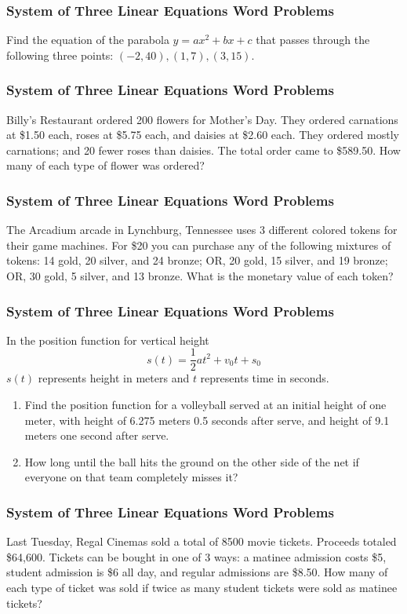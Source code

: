 \documentclass[xcolor=dvipsnames]{beamer}
\begin{document}
\begin{frame}
  \frametitle{System of Three Linear Equations Word Problems}
  {\ubung} Find the equation of the parabola $y=ax^{2}+bx+c$ that
  passes through the following three points: $(-2,40),(1,7),(3,15)$.
\end{frame}

\begin{frame}
  \frametitle{System of Three Linear Equations Word Problems}
  {\ubung} Billy's Restaurant ordered 200 flowers for Mother's Day.
  They ordered carnations at \$1.50 each, roses at \$5.75 each, and
  daisies at \$2.60 each. They ordered mostly carnations; and 20 fewer
  roses than daisies. The total order came to \$589.50. How many of
  each type of flower was ordered?
\end{frame}

\begin{frame}
  \frametitle{System of Three Linear Equations Word Problems}
  {\ubung} The Arcadium arcade in Lynchburg, Tennessee uses 3
  different colored tokens for their game machines. For \$20 you can
  purchase any of the following mixtures of tokens: 14 gold, 20
  silver, and 24 bronze; OR, 20 gold, 15 silver, and 19 bronze; OR, 30
  gold, 5 silver, and 13 bronze. What is the monetary value of each
  token?
\end{frame}

\begin{frame}
  \frametitle{System of Three Linear Equations Word Problems}
  {\ubung} In the position function for vertical height
  \begin{equation}
    \label{eq:eicheuth}
    s(t)=\frac{1}{2}at^{2}+v_{0}t+s_{0}
  \end{equation}
  $s(t)$ represents height in meters and $t$ represents time in
  seconds.
  \begin{enumerate}
  \item Find the position function for a volleyball served at an
    initial height of one meter, with height of 6.275 meters 0.5
    seconds after serve, and height of 9.1 meters one second after
    serve.
  \item How long until the ball hits the ground on the other side of
    the net if everyone on that team completely misses it?
  \end{enumerate}
\end{frame}

\begin{frame}
  \frametitle{System of Three Linear Equations Word Problems}
  {\ubung} Last Tuesday, Regal Cinemas sold a total of 8500 movie
  tickets. Proceeds totaled \$64,600. Tickets can be bought in one of
  3 ways: a matinee admission costs \$5, student admission is \$6 all
  day, and regular admissions are \$8.50. How many of each type of
  ticket was sold if twice as many student tickets were sold as
  matinee tickets?
\end{frame}
\end{document}
